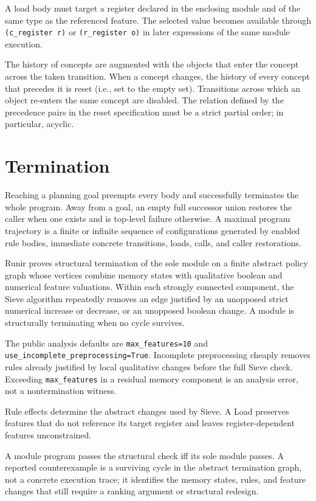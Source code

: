 \documentclass[11pt]{article}
\newcommand{\code}[1]{\texttt{#1}}
\begin{document}
A load body must target a register declared in the enclosing module and of the
same type as the referenced feature. The selected value becomes available through
\code{(c_register r)} or \code{(r_register o)} in later expressions of the same
module execution.

The history of concepts are augmented with the objects that enter the concept
across the taken transition. When a concept changes, the history of every concept
that precedes it is reset (i.e., set to the empty set).
Transitions across which an object re-enters the same concept are disabled.
The relation defined by the precedence pairs in the reset specification
must be a strict partial order; in particular, acyclic.

\section{Termination}

Reaching a planning goal preempts every body and successfully terminates the
whole program. Away from a goal, an empty full successor union restores the
caller when one exists and is top-level failure otherwise. A maximal program
trajectory is a finite or infinite sequence of configurations generated by
enabled rule bodies, immediate concrete transitions, loads, calls, and caller
restorations.

Runir proves structural termination of the sole module on a finite abstract policy
graph whose vertices combine memory states with qualitative boolean and
numerical feature valuations. Within each strongly connected component, the
Sieve algorithm repeatedly removes an edge justified by an unopposed strict
numerical increase or decrease, or an unopposed boolean change. A module is
structurally terminating when no cycle survives.

The public analysis defaults are \code{max_features=10} and
\code{use_incomplete_preprocessing=True}. Incomplete preprocessing cheaply
removes rules already justified by local qualitative changes before the full
Sieve check. Exceeding \code{max_features} in a residual memory component is an
analysis error, not a nontermination witness.

Rule effects determine the abstract changes used by Sieve.
A Load preserves features that do not reference its target register and leaves
register-dependent features unconstrained.

A module program passes the structural check iff its sole module passes. A
reported counterexample is a surviving cycle in the abstract termination graph,
not a concrete execution trace; it identifies the memory states, rules, and
feature changes that still require a ranking argument or structural redesign.
\end{document}
